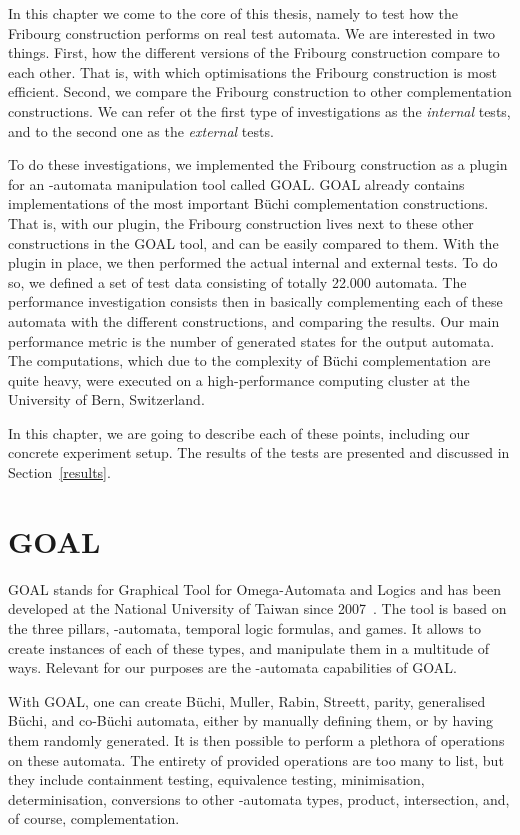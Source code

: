 

\minitoc

In this chapter we come to the core of this thesis, namely to test how the Fribourg construction performs on real test automata. We are interested in two things. First, how the different versions of the Fribourg construction compare to each other. That is, with which optimisations the Fribourg construction is most efficient. Second, we compare the Fribourg construction to other complementation constructions. We can refer ot the first type of investigations as the \textit{internal} tests, and to the second one as the \textit{external} tests.

To do these investigations, we implemented the Fribourg construction as a plugin for an \om-automata manipulation tool called GOAL. GOAL already contains implementations of the most important Büchi complementation constructions. That is, with our plugin, the Fribourg construction lives next to these other constructions in the GOAL tool, and can be easily compared to them. With the plugin in place, we then performed the actual internal and external tests. To do so, we defined a set of test data consisting of totally 22.000 automata. The performance investigation consists then in basically complementing each of these automata with the different constructions, and comparing the results. Our main performance metric is the number of generated states for the output automata. The computations, which due to the complexity of Büchi complementation are quite heavy, were executed on a high-performance computing cluster at the University of Bern, Switzerland.

In this chapter, we are going to describe each of these points, including our concrete experiment setup. The results of the tests are presented and discussed in Section~\ref{results}.


\section{GOAL}
\label{goal}
GOAL stands for Graphical Tool for Omega-Automata and Logics and has been developed at the National University of Taiwan since 2007~\cite{2007_goal,2008_goal_ext}. The tool is based on the three pillars, \om-automata, temporal logic formulas, and games. It allows to create instances of each of these types, and manipulate them in a multitude of ways. Relevant for our purposes are the \om-automata capabilities of GOAL.

With GOAL, one can create Büchi, Muller, Rabin, Streett, parity, generalised Büchi, and co-Büchi automata, either by manually defining them, or by having them randomly generated. It is then possible to perform a plethora of operations on these automata. The entirety of provided operations are too many to list, but they include containment testing, equivalence testing, minimisation, determinisation, conversions to other \om-automata types, product, intersection, and, of course, complementation.

